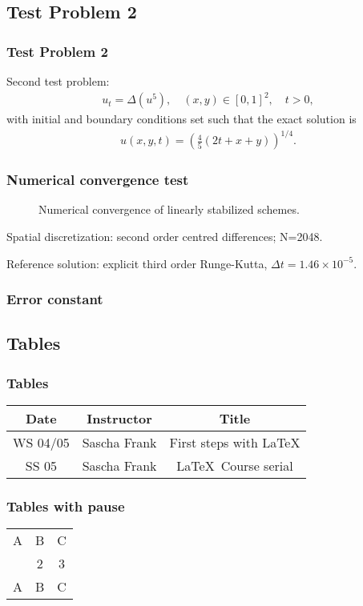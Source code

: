 \documentclass[hyperref={pdfpagelabels=false}]{beamer}
\begin{document}
\subsection{Test Problem 2}
\begin{frame}
	\frametitle{Test Problem 2} 
Second test problem: 
\begin{align*}
u_t = \Delta(u^5), 
\quad (x,y) \in [0,1]^2, \quad t > 0, 
\end{align*}
with initial and boundary conditions set such that the exact solution is 
\begin{align*}
u(x,y,t) = \left(\frac{4}{5}(2t+x+y) \right)^{1/4}.
\end{align*}
\end{frame}
\begin{frame}
	\frametitle{Numerical convergence test}
	\begin{figure}[t]
		\centering
		\caption{Numerical convergence of linearly stabilized schemes.}
	\end{figure}
	Spatial discretization: second order centred differences; N=2048.
	
	Reference solution: explicit third order Runge-Kutta, $\Delta t = 1.46\times 10^{-5}$.
\end{frame}
\begin{frame}
	\frametitle{Error constant}
\end{frame}


\subsection{Tables}
\begin{frame}
\frametitle{Tables}
\begin{tabular}{|c|c|c|}
\hline
\textbf{Date} & \textbf{Instructor} & \textbf{Title} \\
\hline
WS 04/05 & Sascha Frank & First steps with  \LaTeX  \\
\hline
SS 05 & Sascha Frank & \LaTeX \ Course serial \\
\hline
\end{tabular}
\end{frame}


\begin{frame}
\frametitle{Tables with pause}
\begin{tabular}{c c c}
A & B & C \\ 
\pause 
1 & 2 & 3 \\  
\pause 
A & B & C \\ 
\end{tabular} 
\end{frame}
\end{document}
